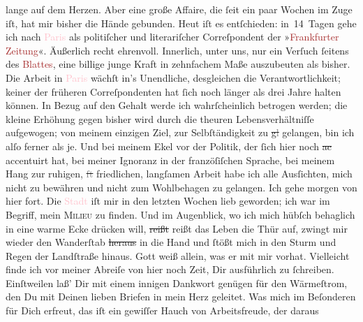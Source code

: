 \documentclass[twoside=false,titlepage=false,open=any, parskip=never, fontsize=12pt, headings=small, chapterprefix=false, appendixprefix=false]{scrbook}
\newcommand{\strikeout}[1]{\sout{#1}}
\newcommand{\pbposition}{\depth}
\newcommand{\pb}{\nobreak\hspace{0pt}\raisebox{-0.1em}{\raisebox{\pbposition}{\textnormal{|}}}\nobreak\hspace{0pt}}
\begin{document}
               lange auf dem Herzen. Aber eine große Affaire, die ſeit ein paar Wochen im Zuge iſt,
               hat mir bisher die Hände gebunden. Heut iſt es entſchieden: in 14 Tagen gehe ich nach
                  \textcolor{pink}{Paris}{}\ledrightnote{\textcolor{pink}{Paris}} als politiſcher und literariſcher
               Correſpondent der »\textcolor{brown}{Frankfurter Zeitung}{}\ledrightnote{\textcolor{brown}{Frankfurter Zeitung}}«.
               Äußerlich recht ehrenvoll. Innerlich, unter uns, nur ein Verſuch ſeitens des \textcolor{brown}{Blattes}{}, eine billige junge
               Kraft in zehnfachem Maße auszubeuten als bisher. Die Arbeit in \textcolor{pink}{Paris}{}\ledrightnote{\textcolor{pink}{Paris}} wächſt in’s Unendliche, desgleichen die
               Verantwortlichkeit; keiner der früheren Correſpondenten {\pb}hat ſich noch länger als drei Jahre halten können.
               In Bezug auf den Gehalt werde ich wahrſcheinlich betrogen werden; die kleine Erhöhung
               gegen bisher wird durch die theuren Lebensverhältniſſe aufgewogen; von meinem
               einzigen Ziel, zur Selbſtändigkeit zu \strikeout{g\textcolor{gray}{l}} gelangen, bin ich alſo ferner als je. Und bei meinem Ekel vor der Politik, der
               ſich hier noch \strikeout{ac} accentuirt hat, bei meiner Ignoranz
               in der franzöſiſchen Sprache, bei meinem Hang zur ruhigen, \strikeout{\textcolor{gray}{ſt}} friedlichen, langſamen Arbeit habe ich alle Ausſichten, mich nicht zu bewähren
               und nicht zum Wohlbehagen zu gelangen. Ich gehe morgen
               von hier fort. Die \textcolor{pink}{Stadt}{} iſt
               mir in den letzten Wochen lieb geworden; ich war im Begriff, mein \textsc{Milieu} zu finden. Und im Augenblick, wo ich mich hübſch
               behaglich in eine warme Ecke drücken will, {\pb}\strikeout{reißt} reißt das Leben die Thür auf, zwingt mir wieder
               den Wanderſtab \strikeout{heraus} in die Hand und ſtößt mich in
               den Sturm und Regen der Landſtraße hinaus. Gott weiß allein, was er mit mir
               vorhat.\pend
           \pstart
           Vielleicht finde ich vor meiner Abreiſe von hier noch Zeit, Dir ausführlich zu
               ſchreiben. Einſtweilen laß’ Dir mit einem innigen Dankwort genügen für den
               Wärmeſtrom, den Du mit Deinen lieben Briefen in mein Herz geleitet. Was mich im
               Beſonderen für Dich erfreut, das iſt ein gewiſſer Hauch von Arbeitsfreude, der daraus
\end{document}

